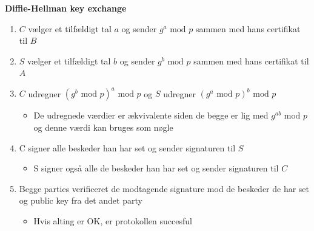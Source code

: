 \documentclass[a4, english]{article}
\begin{document}
\begin{framed} 
  \begin{center}  
     \textbf{Diffie-Hellman key exchange} 
  \end{center}
  \begin{enumerate}
  	\item $C$ vælger et tilfældigt tal $a$ og sender $g^a \text{ mod } p$ sammen med hans certifikat til $B$ 
    \item $S$ vælger et tilfældigt tal $b$ og sender $g^b \text{ mod } p$ sammen med hans certifikat til $A$ 
    \item $C$ udregner $(g^b \text{ mod } p) ^a \text{ mod } p$ og $S$ udregner $(g^a \text{ mod } p) ^b \text{ mod } p$
    \begin{itemize}
    	\item De udregnede værdier er ækvivalente siden de begge er lig med $g^{ab}  \text{ mod } p$ og denne værdi kan bruges som nøgle 
    \end{itemize}
    \item C signer alle beskeder han har set og sender signaturen til $S$
    \begin{itemize}
    	\item S signer også alle de beskeder han har set og sender signaturen til $C$  
    \end{itemize} 
    \item Begge parties verificeret de modtagende signature mod de beskeder de har set og public key fra det andet party
    \begin{itemize}
    	\item Hvis alting er OK, er protokollen succesful 
    \end{itemize}
  \end{enumerate}
\end{framed}
\end{document}
